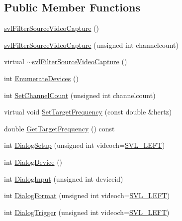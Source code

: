 \subsection*{Public Member Functions}
\begin{DoxyCompactItemize}
\item 
\hyperlink{classsvl_filter_source_video_capture_a7f25fb86c326d7abb1b1d83a336283ab}{svl\-Filter\-Source\-Video\-Capture} ()
\item 
\hyperlink{classsvl_filter_source_video_capture_a3f7ef92098e7365ea75adfd3b5ba6084}{svl\-Filter\-Source\-Video\-Capture} (unsigned int channelcount)
\item 
virtual \hyperlink{classsvl_filter_source_video_capture_aa562e71761456f45d66fdad6855508a2}{$\sim$svl\-Filter\-Source\-Video\-Capture} ()
\item 
int \hyperlink{classsvl_filter_source_video_capture_aa23d8b697cd920034d4b2eca29defcea}{Enumerate\-Devices} ()
\item 
int \hyperlink{classsvl_filter_source_video_capture_af5e7798d59ea80decda47baaa233f637}{Set\-Channel\-Count} (unsigned int channelcount)
\item 
virtual void \hyperlink{classsvl_filter_source_video_capture_adfd8794f6f06b431beb7022370b7b6ef}{Set\-Target\-Frequency} (const double \&hertz)
\item 
double \hyperlink{classsvl_filter_source_video_capture_a79b4017c863b616bb138b54d4875d280}{Get\-Target\-Frequency} () const 
\item 
int \hyperlink{classsvl_filter_source_video_capture_a312929cfc056417d0884be3575e12072}{Dialog\-Setup} (unsigned int videoch=\hyperlink{svl_definitions_8h_ab9fec7615f19c8df2919eebcab0b187f}{S\-V\-L\-\_\-\-L\-E\-F\-T})
\item 
int \hyperlink{classsvl_filter_source_video_capture_ac406e5e23bd3a8aa68f6b17e6d8afa99}{Dialog\-Device} ()
\item 
int \hyperlink{classsvl_filter_source_video_capture_a6dbe33ac0c7aebb296ebcf16c3b8c860}{Dialog\-Input} (unsigned int deviceid)
\item 
int \hyperlink{classsvl_filter_source_video_capture_a70944875b11f999ccbe6f50874e694d0}{Dialog\-Format} (unsigned int videoch=\hyperlink{svl_definitions_8h_ab9fec7615f19c8df2919eebcab0b187f}{S\-V\-L\-\_\-\-L\-E\-F\-T})
\item 
int \hyperlink{classsvl_filter_source_video_capture_aa0be0c5befb0a6fc76277a1df61c5513}{Dialog\-Trigger} (unsigned int videoch=\hyperlink{svl_definitions_8h_ab9fec7615f19c8df2919eebcab0b187f}{S\-V\-L\-\_\-\-L\-E\-F\-T})

\end{DoxyCompactItemize}
